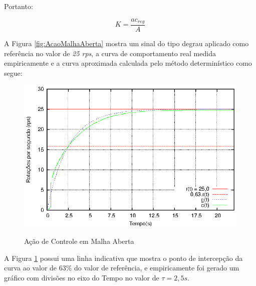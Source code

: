 Portanto:

\begin{equation}
K = \frac{ac_{reg}}{A}
\label{eq:calcK}
\end{equation}









A Figura \ref{fig:AcaoMalhaAberta} mostra um sinal do tipo degrau aplicado como referência no valor de \emph{25 rps}, a curva de comportamento real medida empiricamente e a curva aproximada calculada pelo método determinístico como segue:

\begin{figure}[!htb]
\caption{Ação de Controle em Malha Aberta}
\center\includegraphics[scale=1.4]{./imagens/acaoMalhaAbertaTau.eps}
\label{fig:acaoMalhaAberTau}
\end{figure}

A Figura \ref{fig:acaoMalhaAberTau} possui uma linha indicativa que mostra o ponto de intercepção da curva ao valor de 63\% do valor de referência, e empiricamente foi gerado um gráfico com divisões no eixo do Tempo no valor de $\tau = 2,5s $.

